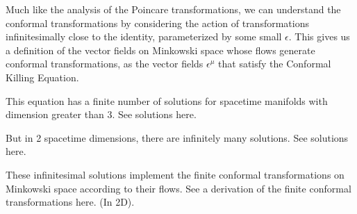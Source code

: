 Much like the analysis of the Poincare transformations, we can understand the conformal transformations by considering the action of transformations infinitesimally close to the identity, parameterized by some small $\epsilon$. This gives us a definition of the vector fields on Minkowski space whose flows generate conformal transformations, as the vector fields $\epsilon^\mu$ that satisfy the Conformal Killing Equation.

This equation has a finite number of solutions for spacetime manifolds with dimension greater than 3. See solutions here.

But in 2 spacetime dimensions, there are infinitely many solutions. See solutions here.

These infinitesimal solutions implement the finite conformal transformations on Minkowski space according to their flows. See a derivation of the finite conformal transformations here. (In 2D).
